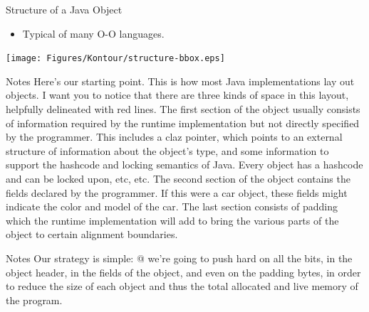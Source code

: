\documentclass[%
pdf,
colorBG,
slideColor,
nototal,
oqe
]{prosper}
\newenvironment{talknotes}{\begin{slide}{Notes}\tiny}{\end{slide}}
\begin{document}
\begin{slide}{Structure of a Java Object}
\begin{itemize}
\item Typical of many O-O languages.
\end{itemize}
\begin{center}
\texttt{[image: Figures/Kontour/structure-bbox.eps]}
\end{center}
\end{slide}

\begin{talknotes}
Here's our starting point.  This is how most Java implementations lay
out objects.  I want you to notice that there are three kinds of space
in this layout, helpfully delineated with red lines.  The first
section of the object usually consists of information required by
the runtime implementation but not directly specified by the
programmer.  This includes a claz pointer, which points to an
external structure of information about the object's type, and
some information to support the hashcode and locking semantics of
Java.  Every object has a hashcode and can be locked upon, etc, etc.
The second section of the object contains the fields declared by
the programmer.  If this were a car object, these fields might
indicate the color and model of the car.  The last section
consists of padding which the runtime implementation will
add to bring the various parts of the object to certain alignment
boundaries.
\end{talknotes}


\begin{talknotes}
Our strategy is simple: @ we're going to push hard on all the bits,
in the object header, in the fields of the object, and even on the
padding bytes, in order to reduce the size of each object and thus
the total allocated and live memory of the program.
\end{talknotes}
\end{document}
